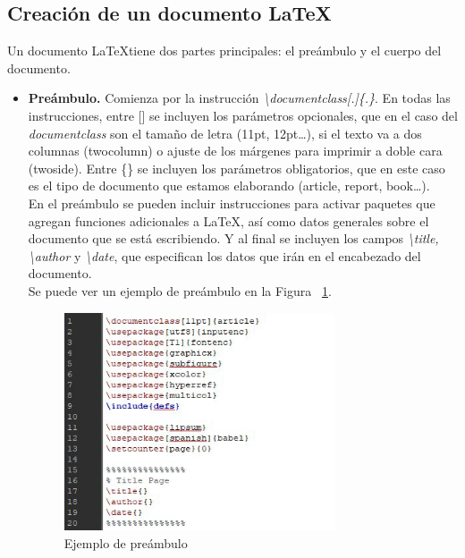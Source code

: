 \documentclass[a4paper, 12pt]{book}
\begin{document}
\subsection{Creación de un documento \LaTeX}
\label{crearLatex}
Un documento \LaTeX tiene dos partes principales: el preámbulo y el cuerpo del documento.
\begin{itemize}
	\item \textbf{Preámbulo.} Comienza por la instrucción \textit{\textbackslash documentclass[.]\{.\}}. En todas las instrucciones, entre [] se incluyen los parámetros opcionales, que en el caso del \textit{documentclass} son el tamaño de letra (11pt, 12pt\ldots), si el texto va a dos columnas (twocolumn) o ajuste de los márgenes para imprimir a doble cara (twoside). Entre \{\} se incluyen los parámetros obligatorios, que en este caso es el tipo de documento que estamos elaborando (article, report, book\ldots).\\
	En el preámbulo se pueden incluir instrucciones para activar paquetes que agregan funciones adicionales a \LaTeX, así como datos generales sobre el documento que se está escribiendo. Y al final se incluyen los campos \textit{\textbackslash title, \textbackslash author} y \textit{\textbackslash date}, que especifican los datos que irán en el encabezado del documento.\\
	Se puede ver un ejemplo de preámbulo en la Figura ~\ref{fig:preambulo}.
	\begin{figure}[h!]
		\centering
		\includegraphics[width=8cm, keepaspectratio]{img/preambulo_latex}
		\caption{Ejemplo de preámbulo}
		\label{fig:preambulo}
	\end{figure}
	

\end{itemize}
\end{document}

